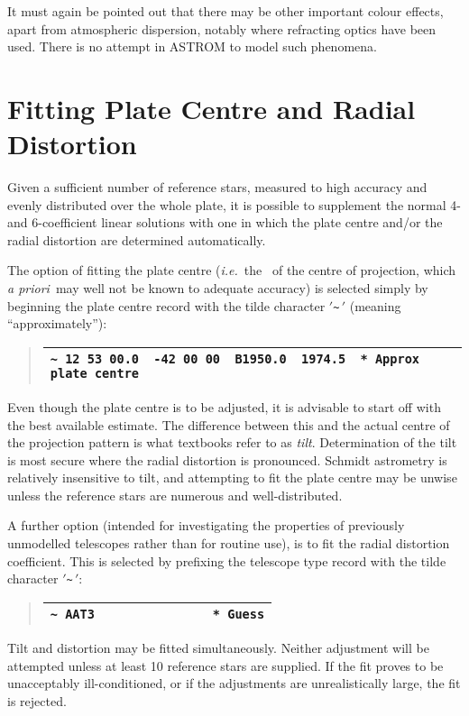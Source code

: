 It must again be pointed out that there may be other important
colour effects, apart from atmospheric dispersion, notably where
refracting optics have been used.  There is no attempt in ASTROM
to model such phenomena.

\section{Fitting Plate Centre and Radial Distortion}
Given a sufficient number of reference stars, measured to high
accuracy and evenly distributed over the whole plate, it is
possible to supplement the normal 4- and 6-coefficient linear
solutions with one in which the plate centre and/or the radial
distortion are determined automatically.

The option of fitting the plate centre ({\it i.e.}\ the \radec\ of
the centre of projection, which {\it a priori}\, may well not be known
to adequate accuracy) is selected simply by beginning the
plate centre
record with the tilde character $'$\verb|~|$\,'$ (meaning ``approximately''):

\goodbreak
\begin{quote}
\begin{tabular}{|l|}
\hline
\verb|~ 12 53 00.0  -42 00 00  B1950.0  1974.5  * Approx plate centre| \\
\hline
\end{tabular}
\end{quote}
Even though the plate centre is to be adjusted, it is advisable to start
off with the best available estimate.  The difference between this
and the actual centre of the projection pattern is what textbooks
refer to as {\it tilt}.  Determination of the tilt is most secure where
the radial distortion is pronounced.  Schmidt astrometry is relatively
insensitive to tilt, and attempting to fit the plate centre may be
unwise unless the reference stars are numerous and well-distributed.

A further option (intended for investigating the properties of
previously unmodelled telescopes rather than for routine use), is to
fit the radial distortion
coefficient.  This is selected by prefixing the telescope type
record with the tilde character $'$\verb|~|$\,'$:
\goodbreak
\begin{quote}
\begin{tabular}{|l|}
\hline
\verb|~ AAT3                * Guess| \\
\hline
\end{tabular}
\end{quote}
Tilt and distortion may be fitted simultaneously.
Neither adjustment will be attempted unless at least 10
reference stars are supplied.  If the fit proves to be
unacceptably ill-conditioned, or if
the adjustments are unrealistically large, the fit is rejected.


